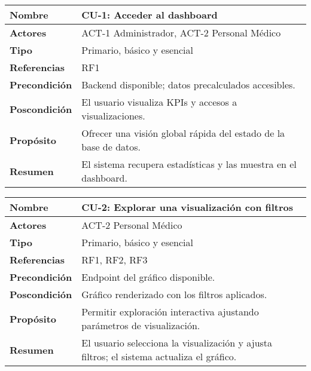 \begin{table}[H]
    \centering
    \begin{tabular}{|l|p{11cm}|}
        \hline
        \textbf{Nombre} & CU-1: Acceder al dashboard \\
        \hline
        \textbf{Actores} & ACT-1 Administrador, ACT-2 Personal Médico \\
        \hline
        \textbf{Tipo} & Primario, básico y esencial \\
        \hline
        \textbf{Referencias} & RF1 \\
        \hline
        \textbf{Precondición} & Backend disponible; datos precalculados accesibles. \\
        \hline
        \textbf{Poscondición} & El usuario visualiza KPIs y accesos a visualizaciones. \\
        \hline
        \textbf{Propósito} & Ofrecer una visión global rápida del estado de la base de datos. \\
        \hline
        \textbf{Resumen} & El sistema recupera estadísticas y las muestra en el dashboard. \\
        \hline
    \end{tabular}
\end{table}

\begin{table}[H]
    \centering
    \begin{tabular}{|l|p{11cm}|}
        \hline
        \textbf{Nombre} & CU-2: Explorar una visualización con filtros \\
        \hline
        \textbf{Actores} & ACT-2 Personal Médico \\
        \hline
        \textbf{Tipo} & Primario, básico y esencial \\
        \hline
        \textbf{Referencias} & RF1, RF2, RF3 \\
        \hline
        \textbf{Precondición} & Endpoint del gráfico disponible. \\
        \hline
        \textbf{Poscondición} & Gráfico renderizado con los filtros aplicados. \\
        \hline
        \textbf{Propósito} & Permitir exploración interactiva ajustando parámetros de visualización. \\
        \hline
        \textbf{Resumen} & El usuario selecciona la visualización y ajusta filtros; el sistema actualiza el gráfico. \\
        \hline
    \end{tabular}
\end{table}


